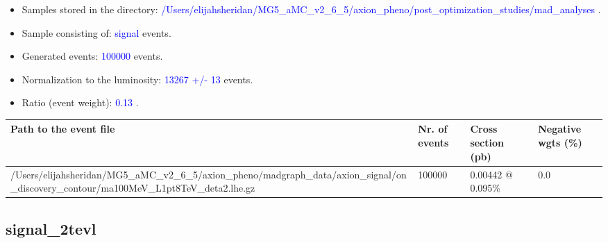 \documentclass[a4paper, 10pt]{article}
\begin{document}
\begin{itemize}
  \item Samples stored in the directory: \textcolor{blue}{/\-Users/\-elijahsheridan/\-MG5\_aMC\_v2\_6\_5/\-axion\_pheno/\-post\_optimization\_studies/\-mad\_analyses} .
   \item Sample consisting of: \textcolor{blue}{signal}  events.
   \item Generated events: \textcolor{blue}{100000 }  events.
   \item Normalization to the luminosity: \textcolor{blue}{13267}\textcolor{blue}{ +/\-- }\textcolor{blue}{13 }  events.
   \item Ratio (event weight): \textcolor{blue}{0.13 } .  
 
\end{itemize}
\begin{table}[H]
  \begin{center}
    \begin{tabular}{|m{55.0mm}|m{25.0mm}|m{30.0mm}|m{30.0mm}|}
      \hline
      {\cellcolor{yellow}         Path to the event file}& {\cellcolor{yellow}         Nr. of events}& {\cellcolor{yellow}         Cross section (pb)}& {\cellcolor{yellow}         Negative wgts (\%)}\\
      \hline
      {\cellcolor{white}          /\-Users/\-elijahsheridan/\-MG5\_aMC\_v2\_6\_5/\-axion\_pheno/\-madgraph\_data/\-axion\_signal/\-on\_discovery\_contour/\-ma100MeV\_L1pt8TeV\_deta2.lhe.gz}& {\cellcolor{white}          100000}& {\cellcolor{white}          0.00442 @ 0.095\%}& {\cellcolor{white}          0.0}\\
\hline
    \end{tabular}
  \end{center}
\end{table}

\subsection{ signal\_2tevl}
\end{document}

